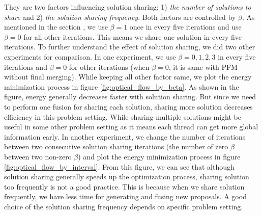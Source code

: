 They are two factors influencing solution sharing: 1) \textit{the number of solutions to share} and 2) \textit{the solution sharing frequency}. Both factors are controlled by $\beta$. As mentioned in the section \label{optical_flow}, we use $\beta = 1$ once in every five iterations and use $\beta = 0$ for all other iterations. This means we share one solution in every five iterations. To further understand the effect of solution sharing, we did two other experiments for comparison. In one experiment, we use $\beta = {0, 1, 2, 3}$ in every five iterations and $\beta = 0$ for other iterations (when $\beta = 0$, it is same with PFM without final merging). While keeping all other factor same, we plot the energy minimization process in figure \ref{fig:optical_flow_by_beta}. As shown in the figure, energy generally decreases faster with solution sharing. But since we need to perform one fusion for sharing each solution, sharing more solution decreases efficiency in this problem setting. While sharing multiple solutions might be useful in some other problem setting as it means each thread can get more global information early. In another experiment, we change the number of iterations between two consecutive solution sharing iterations (the number of zero $\beta$ between two non-zero $\beta$) and plot the energy minimization process in figure \ref{fig:optical_flow_by_interval}. From this figure, we can see that although solution sharing generally speeds up the optimization process, sharing solution too frequently is not a good practice. This is because when we share solution frequently, we have less time for generating and fusing new proposals. A good choice of the solution sharing frequency depends on specific problem setting.
